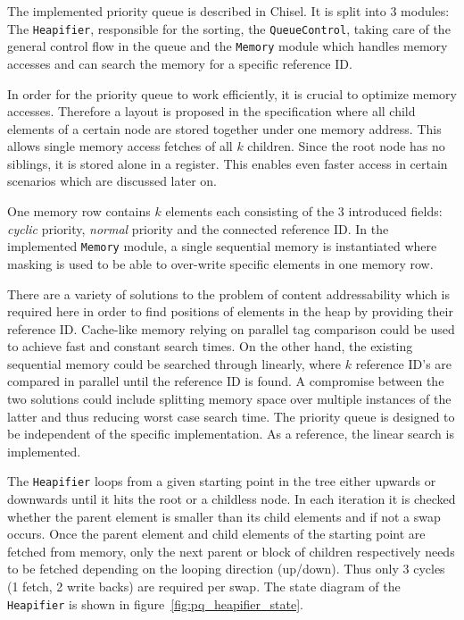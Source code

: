 \documentclass[conference]{IEEEtran}
\begin{document}
The implemented priority queue is described in Chisel.
It is split into 3 modules: The \texttt{Heapifier}, responsible for the sorting, the \texttt{QueueControl}, taking care
of the general control flow in the queue and the \texttt{Memory} module which handles memory accesses and can search the memory for a specific reference 
ID.

In order for the priority queue to work efficiently, it is crucial to optimize memory accesses. Therefore a layout is proposed in the specification where all 
child elements of a certain node are stored together under one memory address. This allows single memory access fetches of all $k$ children. Since 
the root node has no siblings, it is stored alone in a register. This enables even faster access in certain scenarios which are discussed later on.

One memory row contains $k$ elements each consisting of the 3 introduced fields: \textit{cyclic} priority, \textit{normal} priority and the connected
reference ID. In the implemented 
\texttt{Memory} module, a single sequential memory is instantiated where masking is used to be able to over-write specific elements in one memory row.

There are a variety of solutions to the problem of content addressability which is required here in order to find positions of elements in the heap by providing
their reference ID. Cache-like memory relying on parallel tag comparison could be used to achieve fast and constant search times. On the other hand, the 
existing sequential memory could be searched through linearly, where $k$ reference ID's are compared in parallel until the reference ID is found.
A compromise between the two solutions could include splitting memory space over multiple instances of the latter and thus reducing worst case search time.
The priority queue is designed to be independent of the specific implementation. As a reference, the linear search is implemented.

The \texttt{Heapifier} loops from a given starting point in the tree either upwards or downwards until it hits the root or a childless node. In each iteration 
it is checked whether the parent element is smaller than its child elements and if not a swap occurs. Once the parent element and child elements of the starting 
point are fetched from memory, only the next parent or block of children respectively needs to be fetched depending on the looping direction (up/down). Thus 
only 3 cycles (1 fetch, 2 write backs) are required per swap. The state diagram of the \texttt{Heapifier} is shown in figure~\ref{fig:pq_heapifier_state}.
\end{document}
